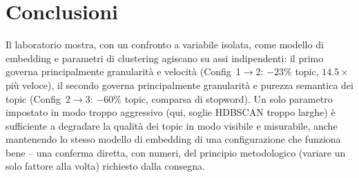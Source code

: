 \documentclass[12pt,a4paper]{article}
\begin{document}
\section{Conclusioni}

Il laboratorio mostra, con un confronto a variabile isolata, come modello di embedding e parametri di clustering agiscano su assi indipendenti: il primo governa principalmente granularit\`a e velocit\`a (Config~1$\to$2: $-23\%$ topic, $14.5\times$ pi\`u veloce), il secondo governa principalmente granularit\`a e purezza semantica dei topic (Config~2$\to$3: $-60\%$ topic, comparsa di stopword). Un solo parametro impostato in modo troppo aggressivo (qui, soglie HDBSCAN troppo larghe) \`e sufficiente a degradare la qualit\`a dei topic in modo visibile e misurabile, anche mantenendo lo stesso modello di embedding di una configurazione che funziona bene -- una conferma diretta, con numeri, del principio metodologico (variare un solo fattore alla volta) richiesto dalla consegna.
\end{document}
